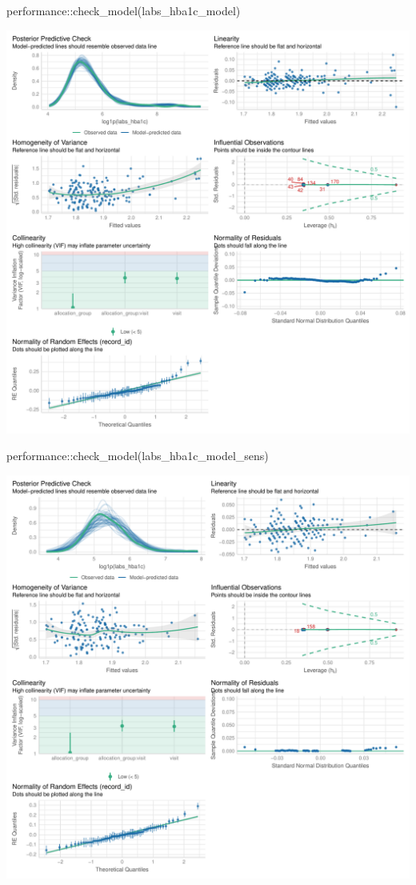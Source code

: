 \documentclass[
  12pt,
]{article}
\newenvironment{Shaded}{\begin{snugshade}}{\end{snugshade}}
\newcommand{\FunctionTok}[1]{\textcolor[rgb]{0.28,0.35,0.67}{#1}}
\newcommand{\NormalTok}[1]{\textcolor[rgb]{0.00,0.23,0.31}{#1}}
\newcommand{\SpecialCharTok}[1]{\textcolor[rgb]{0.37,0.37,0.37}{#1}}
\begin{document}
\begin{Shaded}
\begin{Highlighting}[]
\NormalTok{performance}\SpecialCharTok{::}\FunctionTok{check\_model}\NormalTok{(labs\_hba1c\_model)}
\end{Highlighting}
\end{Shaded}

\includegraphics{Outcomes_files/figure-pdf/labs_hba1c_4-1.pdf}

\begin{Shaded}
\begin{Highlighting}[]
\NormalTok{performance}\SpecialCharTok{::}\FunctionTok{check\_model}\NormalTok{(labs\_hba1c\_model\_sens)}
\end{Highlighting}
\end{Shaded}

\includegraphics{Outcomes_files/figure-pdf/labs_hba1c_4-2.pdf}
\end{document}
